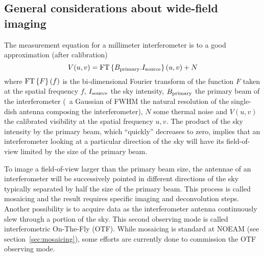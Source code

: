 \subsection{General considerations about wide-field imaging}

The measurement equation for a millimeter interferometer is to a good
approximation (after calibration)
\begin{equation}
  V(u,v) = \mbox{FT}\displaystyle\left\{ B_{\mathrm{primary}}.I_{\mathrm{source}} \right\}(u,v)+N
\end{equation}
where $\mbox{FT}\displaystyle\left\{ F \right\}(f)$ is the bi-dimensional Fourier transform of
the function $F$ taken at the spatial frequency $f$, $I_{\mathrm{source}}$ the
sky intensity, $B_{\mathrm{primary}}$ the primary beam of the interferometer
(\ie\ a Gaussian of FWHM the natural resolution of the single-dish antenna
composing the interferometer), $N$ some thermal noise and $V(u,v)$ the
calibrated visibility at the spatial frequency $u,v$. The product of the
sky intensity by the primary beam, which ``quickly'' decreases to zero,
implies that an interferometer looking at a particular direction of the sky
will have its field-of-view limited by the size of the primary beam.
 
To image a field-of-view larger than the primary beam size, the antennae of
an interferometer will be successively pointed in different directions of
the sky typically separated by half the size of the primary beam. This
process is called mosaicing and the result requires specific imaging and
deconvolution steps. Another possibility is to acquire data as the
interferometer antenna continuously slew through a portion of the sky. This
second observing mode is called interferometric On-The-Fly (OTF). While
mosaicing is standard at NOEAM (see section~\ref{sec:mosaicing}), some
efforts are currently done to commission the OTF observing mode.

